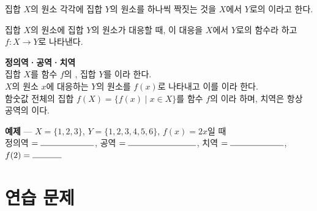 \documentclass[11pt,a4paper]{article}
\newcommand{\fillblank}[1]{\makebox[#1]{\hrulefill}}
\begin{document}
\begin{sheetbox}
집합 $X$의 원소 각각에 집합 $Y$의 원소를 하나씩 짝짓는 것을 $X$에서 $Y$로의 \fillblank{2.2cm}이라고 한다.

\vspace{6pt}
집합 $X$의 \fillblank{2.6cm} 원소에 집합 $Y$의 원소가 \fillblank{2.6cm} 대응할 때, 이 대응을 $X$에서 $Y$로의 함수라 하고 $f:X\to Y$로 나타낸다.

\vspace{8pt}
\textbf{정의역·공역·치역}\\
집합 $X$를 함수 $f$의 \fillblank{1.6cm}, 집합 $Y$를 \fillblank{1.6cm}이라 한다.\\
$X$의 원소 $x$에 대응하는 $Y$의 원소를 $f(x)$로 나타내고 이를 \fillblank{2.2cm}이라 한다.\\
함숫값 전체의 집합 $f(X)=\{f(x)\mid x\in X\}$를 함수 $f$의 \fillblank{1.6cm}이라 하며, 치역은 항상 공역의 \fillblank{2.4cm}이다.

\vspace{8pt}
\textbf{예제} --- $X=\{1,2,3\}$, $Y=\{1,2,3,4,5,6\}$, $f(x)=2x$일 때\\
정의역 $=\fillblank{2.2cm}$, \quad 공역 $=\fillblank{2.8cm}$, \quad 치역 $=\fillblank{2.2cm}$, \quad $f(2)=\fillblank{1.2cm}$
\end{sheetbox}

\section{연습 문제}
\end{document}
